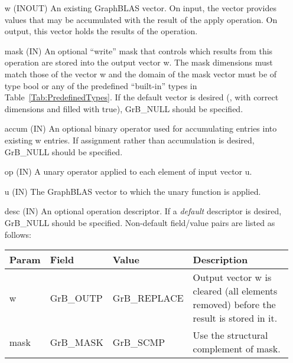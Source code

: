 \begin{itemize}[leftmargin=1.1in]
    \item[{\sf w}]    ({\sf INOUT}) An existing GraphBLAS vector.  On input,
    the vector provides values that may be accumulated with the result of the
    apply operation.  On output, this vector holds the results of the
    operation.

    \item[{\sf mask}] ({\sf IN}) An optional ``write'' mask that controls which
    results from this operation are stored into the output vector {\sf w}. The 
    mask dimensions must match those of the vector {\sf w} and the domain of the
    {\sf mask} vector must be of type {\sf bool} or any of the predefined 
    ``built-in'' types in Table~\ref{Tab:PredefinedTypes}.  If the default
    vector is desired (\ie, with correct dimensions and filled with {\sf true}), 
    {\sf GrB\_NULL} should be specified.

    \item[{\sf accum}] ({\sf IN}) An optional binary operator used for accumulating
    entries into existing {\sf w} entries. If assignment rather than accumulation is
    desired, {\sf GrB\_NULL} should be specified.

    \item[{\sf op}]	({\sf IN}) A unary operator applied to 
    each element of input vector {\sf u}.
        
    \item[{\sf u}] ({\sf IN}) The GraphBLAS vector to which the unary function
    is applied.

    \item[{\sf desc}] ({\sf IN}) An optional operation descriptor. If
    a \emph{default} descriptor is desired, {\sf GrB\_NULL} should be
    specified. Non-default field/value pairs are listed as follows:  \\

    \begin{tabular}{lllp{2.5in}}
        Param & Field  & Value & Description \\
        \hline
        {\sf w}    & {\sf GrB\_OUTP} & {\sf GrB\_REPLACE} & Output vector {\sf w}
        is cleared (all elements removed) before the result is stored in it.\\

        {\sf mask} & {\sf GrB\_MASK} & {\sf GrB\_SCMP}   & Use the structural
        complement of {\sf mask}. \\
    \end{tabular}
\end{itemize}

